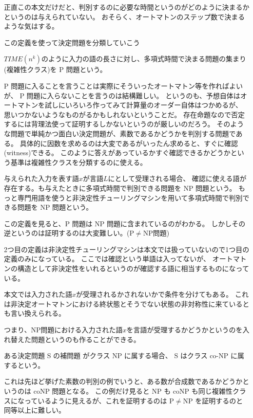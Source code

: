 \documentclass[../../master.tex]{subfiles}
\begin{document}
正直この本文だけだと、判別するのに必要な時間というのがどのように決まるかというのは与えられていない。
おそらく、オートマトンのステップ数で決まるような気はする。

この定義を使って決定問題を分類していこう
\begin{tcolorbox}[title = P 問題]
    \(TIME(n^k)\)のように入力の語の長さに対し、多項式時間で決まる問題の集まり(複雑性クラス)を P 問題という。
\end{tcolorbox}

P 問題に入ることを言うことは実際にそういったオートマトン等を作ればよいが、
P 問題に入らないことを言うのは結構難しい。
というのも、予想自体はオートマトンを試しにいろいろ作ってみて計算量のオーダー自体はつかめるが、
思いつかないようなものがるかもしれないということだ。
存在命題なので否定するには背理法使って証明するしかないというのが厳しいのだろう。
そのような問題で単純かつ面白い決定問題が、素数であるかどうかを判別する問題である。
具体的に因数を求めるのは大変であるがいったん求めると、すぐに確認(witness)できる。
このように答えがあっているかすぐ確認できるかどうかという基準は複雑性クラスを分類するのに使える。

\begin{tcolorbox}[title = NP 問題]
    与えられた入力を表す語\(x\)が言語\(L\)にとして受理される場合、
    確認に使える語が存在する。も与えたときに多項式時間で判別できる問題を NP 問題という。
    もっと専門用語を使うと非決定性チューリングマシンを用いて多項式時間で判別できる問題を NP 問題という。
\end{tcolorbox}
この定義を見ると、P 問題は NP 問題に含まれているのがわかる。
しかしその逆というのは証明するのは大変難しい。(P\(\neq\)NP問題)

2つ目の定義は非決定性チューリングマシンは本文では扱っていないので1つ目の定義のみになっている。
ここでは確認という単語は入ってないが、
オートマトンの構造として非決定性をいれるというのが確認する語に相当するものになっている。

本文では入力された語\(x\)が受理されるかされないかで条件を分けてもある。
これは非決定オートマトンにおける終状態とそうでない状態の非対称性に来ているとも言い換えられる。

つまり、NP問題における入力された語\(x\)を言語が受理するかどうかというのを入れ替えた問題というのも作ることができる。
\begin{tcolorbox}[title = coNP 問題]
    ある決定問題 S の補問題 がクラス NP に属する場合、 S はクラス co-NP に属するという。
\end{tcolorbox}
これは先ほど挙げた素数の判別の例でいうと、ある数が合成数であるかどうかというのは coNP 問題となる。
この例だけ見ると NP も coNP も同じ複雑性クラスになっているように見えるが、これを証明するのは P\(\neq\)NP を証明するのと同等以上に難しい。
\end{document}
